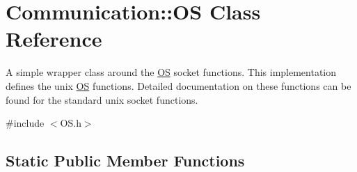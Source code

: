 \hypertarget{class_communication_1_1_o_s}{}\section{Communication\+:\+:O\+S Class Reference}
\label{class_communication_1_1_o_s}


A simple wrapper class around the \hyperlink{class_communication_1_1_o_s}{O\+S} socket functions. This implementation defines the unix \hyperlink{class_communication_1_1_o_s}{O\+S} functions. Detailed documentation on these functions can be found for the standard unix socket functions.  




{\ttfamily \#include $<$O\+S.\+h$>$}

\subsection*{Static Public Member Functions}
